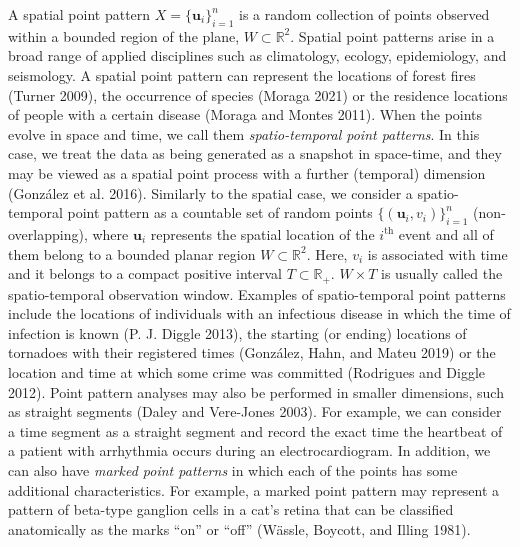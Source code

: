A spatial point pattern \(X=\{\mathbf{u}_i\}_{i=1}^n\) is a random collection of points observed within a bounded region of the plane, \(W \subset\mathbb{R}^2\). Spatial point patterns arise in a broad range of applied disciplines such as climatology, ecology, epidemiology, and seismology. A spatial point pattern can represent the locations of forest fires (Turner 2009), the occurrence of species (Moraga 2021) or the residence locations of people with a certain disease (Moraga and Montes 2011). When the points evolve in space and time, we call them \emph{spatio-temporal point patterns}.
In this case, we treat the data as being generated as a snapshot in space-time, and they may be viewed as a spatial point process with a further (temporal) dimension (González et al. 2016). Similarly to the spatial case, we consider a spatio-temporal point pattern as a countable set of random points \(\{(\mathbf{u}_i,v_i)\}_{i=1}^n\) (non-overlapping), where \(\mathbf{u}_i\) represents the spatial location of the \(i^{\text{th}}\) event and all of them belong to a bounded planar region \(W \subset\mathbb{R}^2\). Here, \(v_i\) is associated with time and it belongs to a compact positive interval \(T\subset \mathbb{R}_+\). \(W \times T\) is usually called the spatio-temporal observation window. Examples of spatio-temporal point patterns include the locations of individuals with an infectious disease in which the time of infection is known (P. J. Diggle 2013), the starting (or ending) locations of tornadoes with their registered times (González, Hahn, and Mateu 2019) or the location and time at which some crime was committed (Rodrigues and Diggle 2012). Point pattern analyses may also be performed in smaller dimensions, such as straight segments (Daley and Vere-Jones 2003). For example, we can consider a time segment as a straight segment and record the exact time the heartbeat of a patient with arrhythmia occurs during an electrocardiogram. In addition, we can also have \emph{marked point patterns} in which each of the points has some additional characteristics. For example, a marked point pattern may represent a pattern of beta-type ganglion cells in a cat's retina that can be classified anatomically as the marks ``on'' or ``off'' (Wässle, Boycott, and Illing 1981).

